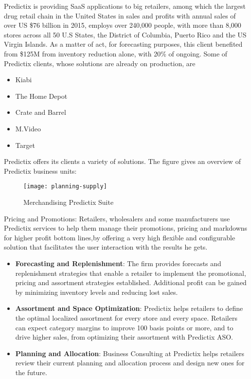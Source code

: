 Predictix is providing SaaS applications to big retailers, among which the
largest drug retail chain in the United States in sales and profits with annual
sales of over US \$76 billion in 2015, employs over 240,000 people, with more
than 8,000 stores  across all 50 U.S States, the District of Columbia, Puerto
Rico and the US Virgin Islands. As a matter of act, for forecasting purposes,
this client benefited from \$125M from inventory reduction alone, with 20\% of
ongoing. Some of Predictix clients, whose solutions are already on production,
are
\begin{itemize}
\item{Kiabi}
\item{The Home Depot}
\item{Crate and Barrel}
\item{M.Video}
\item{Target}
\end{itemize}

Predictix offers its clients a variety of solutions. The figure gives an
overview of Predictix business units:

\begin{figure}[h]
  \center
  \texttt{[image: planning-supply]}
\caption{Merchandising Predictix Suite}
\label{fig:planning-supply}
\end{figure}

Pricing and Promotions: Retailers, wholesalers and some manufacturers use
Predictix services to help them manage their promotions, pricing and markdowns
for higher profit bottom lines,by offering a very high flexible and
configurable solution that facilitates the user interaction with the results he
gets.

\begin{itemize}
\item{\textbf{Forecasting  and Replenishment}: The firm provides forecasts and
    replenishment strategies that enable a retailer to implement the
    promotional, pricing and assortment strategies established. Additional
    profit can be gained by minimizing inventory levels and reducing lost
    sales.}

\item{\textbf{Assortment and Space Optimization}: Predictix helps retailers to
    define the optimal localized assortment for every store and every space.
    Retailers can expect category margins to improve 100 basis points or more,
    and to drive higher sales, from optimizing their assortment with Predictix
    ASO.}
\item{\textbf{Planning and  Allocation}: Business Consulting at Predictix helps
    retailers review their current planning and allocation process and design
    new ones for the future.}
\end{itemize}

